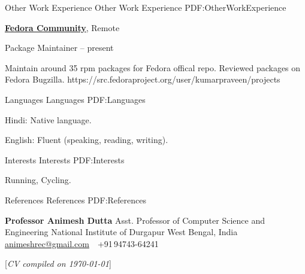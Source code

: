 \documentclass[letterpaper,MMMyyyy,nonstopmode]{simpleresumecv}
\newcommand{\CVNote}{CV compiled on {\today}}
\begin{document}
\begin{Body}

\Section
{Other Work\newline
Experience}
{Other Work Experience}
{PDF:OtherWorkExperience}

\Entry
\href{https://getfedora.org/}
{\textbf{Fedora Community}},
Remote

\Gap
\BulletItem
Package Maintainer
\hfill
{} --
present
\begin{Detail}
\SubBulletItem
Maintain around 35 rpm packages for Fedora offical repo.
\SubBulletItem
Reviewed packages on Fedora Bugzilla.
\SubBulletItem
https://src.fedoraproject.org/user/kumarpraveen/projects
\end{Detail}


\Section
{Languages}
{Languages}
{PDF:Languages}

\BulletItem
Hindi: Native language.

\Gap
\BulletItem
English: Fluent (speaking, reading, writing).


\Section
{Interests}
{Interests}
{PDF:Interests}

\Entry
Running,
Cycling.


\Section
{References}
{References}
{PDF:References}

\BulletItem
\textbf{Professor Animesh Dutta}
\newline
Asst. Professor of Computer Science and Engineering
\newline
National Institute of Durgapur
\newline
West Bengal, India
\newline
\href{mailto:animeshrec@gmail.com}
{animeshrec@gmail.com}
\,\SubBulletSymbol\,
+91\,94743-64241


\UseNoteFont%
\null\hfill%
[\textit{\CVNote}]
\end{Body}
\end{document}
